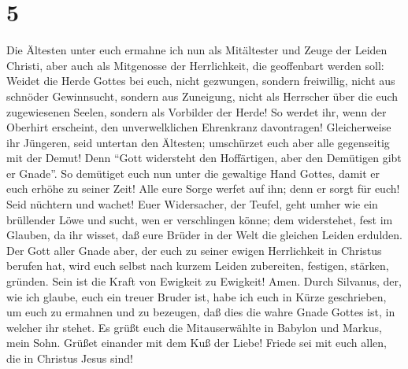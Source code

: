 \hypertarget{section-4}{%
\section{5}\label{section-4}}

 Die Ältesten unter euch ermahne ich nun als Mitältester
und Zeuge der Leiden Christi, aber auch als Mitgenosse der Herrlichkeit,
die geoffenbart werden soll:  Weidet die Herde Gottes bei
euch, nicht gezwungen, sondern freiwillig, nicht aus schnöder
Gewinnsucht, sondern aus Zuneigung,  nicht als Herrscher
über die euch zugewiesenen Seelen, sondern als Vorbilder der Herde!
 So werdet ihr, wenn der Oberhirt erscheint, den
unverwelklichen Ehrenkranz davontragen!  Gleicherweise ihr
Jüngeren, seid untertan den Ältesten; umschürzet euch aber alle
gegenseitig mit der Demut! Denn ``Gott widersteht den Hoffärtigen, aber
den Demütigen gibt er Gnade''.  So demütiget euch nun
unter die gewaltige Hand Gottes, damit er euch erhöhe zu seiner Zeit!
 Alle eure Sorge werfet auf ihn; denn er sorgt für euch!
 Seid nüchtern und wachet! Euer Widersacher, der Teufel,
geht umher wie ein brüllender Löwe und sucht, wen er verschlingen könne;
 dem widerstehet, fest im Glauben, da ihr wisset, daß eure
Brüder in der Welt die gleichen Leiden erdulden.  Der
Gott aller Gnade aber, der euch zu seiner ewigen Herrlichkeit in
Christus berufen hat, wird euch selbst nach kurzem Leiden zubereiten,
festigen, stärken, gründen.  Sein ist die Kraft von
Ewigkeit zu Ewigkeit! Amen.  Durch Silvanus, der, wie ich
glaube, euch ein treuer Bruder ist, habe ich euch in Kürze geschrieben,
um euch zu ermahnen und zu bezeugen, daß dies die wahre Gnade Gottes
ist, in welcher ihr stehet.  Es grüßt euch die
Mitauserwählte in Babylon und Markus, mein Sohn. Grüßet einander mit dem
Kuß der Liebe!  Friede sei mit euch allen, die in
Christus Jesus sind!
